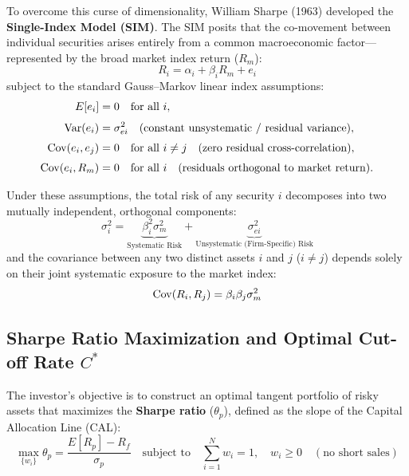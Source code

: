 To overcome this curse of dimensionality, William Sharpe (1963) developed the \textbf{Single-Index Model (SIM)}. The SIM posits that the co-movement between individual securities arises entirely from a common macroeconomic factor—represented by the broad market index return ($R_m$):
\begin{equation}
    R_i = \alpha_i + \beta_i R_m + e_i
\end{equation}
subject to the standard Gauss--Markov linear index assumptions:
\begin{align}
    E[e_i] &= 0 \quad \text{for all } i, \\[0.3em]
    \operatorname{Var}(e_i) &= \sigma_{ei}^2 \quad (\text{constant unsystematic / residual variance}), \\[0.3em]
    \operatorname{Cov}(e_i, e_j) &= 0 \quad \text{for all } i \neq j \quad (\text{zero residual cross-correlation}), \\[0.3em]
    \operatorname{Cov}(e_i, R_m) &= 0 \quad \text{for all } i \quad (\text{residuals orthogonal to market return}).
\end{align}

Under these assumptions, the total risk of any security $i$ decomposes into two mutually independent, orthogonal components:
\begin{equation}
    \sigma_i^2 = \underbrace{\beta_i^2 \sigma_m^2}_{\text{Systematic Risk}} + \underbrace{\sigma_{ei}^2}_{\text{Unsystematic (Firm-Specific) Risk}}
\end{equation}
and the covariance between any two distinct assets $i$ and $j$ ($i \neq j$) depends solely on their joint systematic exposure to the market index:
\begin{equation}
    \operatorname{Cov}(R_i, R_j) = \beta_i \beta_j \sigma_m^2
\end{equation}

\subsection{Sharpe Ratio Maximization and Optimal Cut-off Rate \texorpdfstring{$C^*$}{C*}}
The investor's objective is to construct an optimal tangent portfolio of risky assets that maximizes the \textbf{Sharpe ratio} ($\theta_p$), defined as the slope of the Capital Allocation Line (CAL):
\begin{equation}
    \max_{\{w_i\}} \theta_p = \frac{E[R_p] - R_f}{\sigma_p} \quad \text{subject to} \quad \sum_{i=1}^N w_i = 1, \quad w_i \ge 0 \quad (\text{no short sales})
\end{equation}

